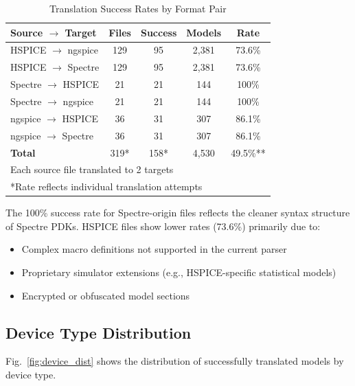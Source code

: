 \documentclass[conference]{IEEEtran}
\begin{document}
\begin{table}[!t]
\caption{Translation Success Rates by Format Pair}
\label{tab:results}
\centering
\renewcommand{\arraystretch}{1.15}
\begin{tabular}{@{}lcccc@{}}
\toprule
\textbf{Source} $\rightarrow$ \textbf{Target} & \textbf{Files} & \textbf{Success} & \textbf{Models} & \textbf{Rate} \\
\midrule
HSPICE $\rightarrow$ ngspice & 129 & 95 & 2,381 & 73.6\% \\
HSPICE $\rightarrow$ Spectre & 129 & 95 & 2,381 & 73.6\% \\
Spectre $\rightarrow$ HSPICE & 21 & 21 & 144 & 100\% \\
Spectre $\rightarrow$ ngspice & 21 & 21 & 144 & 100\% \\
ngspice $\rightarrow$ HSPICE & 36 & 31 & 307 & 86.1\% \\
ngspice $\rightarrow$ Spectre & 36 & 31 & 307 & 86.1\% \\
\midrule
\textbf{Total} & 319* & 158* & 4,530 & 49.5\%** \\
\bottomrule
\multicolumn{5}{l}{\footnotesize *Each source file translated to 2 targets}\\
\multicolumn{5}{l}{\footnotesize **Rate reflects individual translation attempts}\\
\end{tabular}
\end{table}

The 100\% success rate for Spectre-origin files reflects the cleaner syntax structure of Spectre PDKs. HSPICE files show lower rates (73.6\%) primarily due to:

\begin{itemize}
    \item Complex macro definitions not supported in the current parser
    \item Proprietary simulator extensions (e.g., HSPICE-specific statistical models)
    \item Encrypted or obfuscated model sections
\end{itemize}

\subsection{Device Type Distribution}

Fig.~\ref{fig:device_dist} shows the distribution of successfully translated models by device type.
\end{document}
